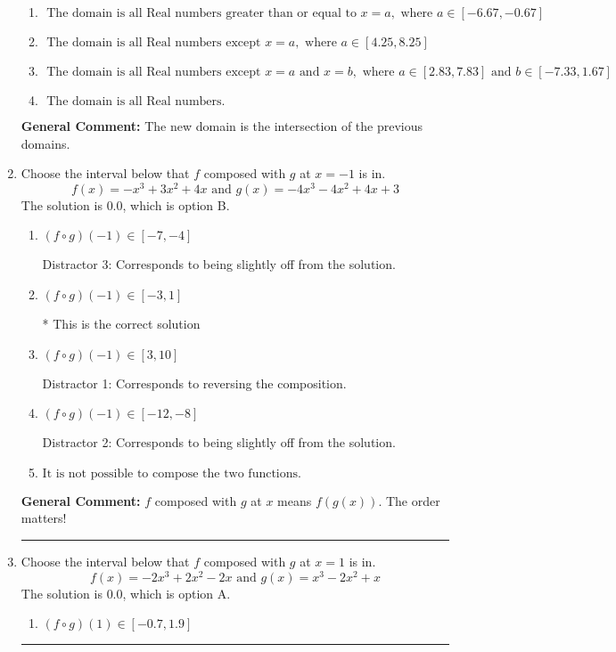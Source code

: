 \documentclass{extbook}[14pt]
\newcommand{\litem}[1]{\item #1

\rule{\textwidth}{0.4pt}}
\begin{document}
\begin{enumerate}
{\begin{enumerate}[label=\Alph*.]
\item \( \text{ The domain is all Real numbers greater than or equal to } x = a, \text{ where } a \in [-6.67, -0.67] \)


\item \( \text{ The domain is all Real numbers except } x = a, \text{ where } a \in [4.25, 8.25] \)


\item \( \text{ The domain is all Real numbers except } x = a \text{ and } x = b, \text{ where } a \in [2.83, 7.83] \text{ and } b \in [-7.33, 1.67] \)


\item \( \text{ The domain is all Real numbers. } \)


\end{enumerate}

\textbf{General Comment:} The new domain is the intersection of the previous domains.
}
\litem{
Choose the interval below that $f$ composed with $g$ at $x=-1$ is in.
\[ f(x) = -x^{3} +3 x^{2} +4 x \text{ and } g(x) = -4x^{3} -4 x^{2} +4 x + 3 \]The solution is \( 0.0 \), which is option B.\begin{enumerate}[label=\Alph*.]
\item \( (f \circ g)(-1) \in [-7, -4] \)

 Distractor 3: Corresponds to being slightly off from the solution.
\item \( (f \circ g)(-1) \in [-3, 1] \)

* This is the correct solution
\item \( (f \circ g)(-1) \in [3, 10] \)

 Distractor 1: Corresponds to reversing the composition.
\item \( (f \circ g)(-1) \in [-12, -8] \)

 Distractor 2: Corresponds to being slightly off from the solution.
\item \( \text{It is not possible to compose the two functions.} \)


\end{enumerate}

\textbf{General Comment:} $f$ composed with $g$ at $x$ means $f(g(x))$. The order matters!
}
\litem{
Choose the interval below that $f$ composed with $g$ at $x=1$ is in.
\[ f(x) = -2x^{3} +2 x^{2} -2 x \text{ and } g(x) = x^{3} -2 x^{2} +x \]The solution is \( 0.0 \), which is option A.\begin{enumerate}[label=\Alph*.]
\item \( (f \circ g)(1) \in [-0.7, 1.9] \)


\end{enumerate}}
\end{enumerate}
\end{document}
